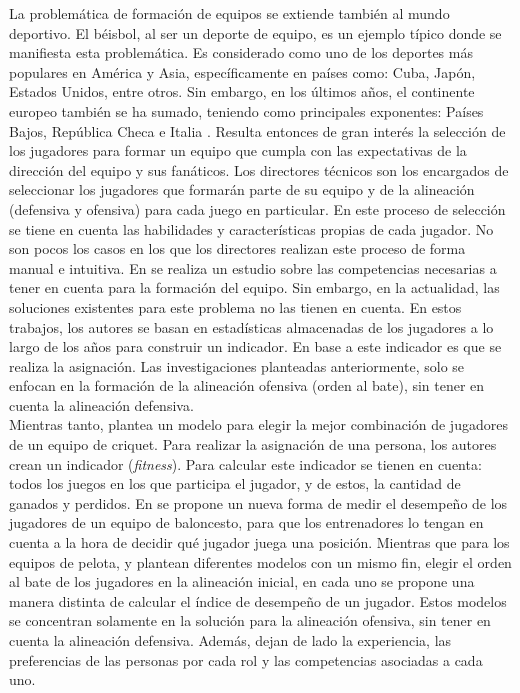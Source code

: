 La problemática de formación de equipos se extiende también al mundo deportivo. El béisbol, al ser un deporte de equipo, es un ejemplo típico donde se manifiesta esta problemática. Es considerado como uno de los deportes más populares en América y Asia, específicamente en países como: Cuba, Japón, Estados Unidos, entre otros. Sin embargo, en los últimos años, el continente europeo también se ha sumado, teniendo como principales exponentes: Países Bajos, República Checa e Italia \cite{WBSC2021}. Resulta entonces de gran interés la selección de los jugadores para formar un equipo que cumpla con las expectativas de la dirección del equipo y sus fanáticos. Los directores técnicos son los encargados de seleccionar los jugadores que formarán parte de su equipo y de la alineación (defensiva y ofensiva) para cada juego en particular. En este proceso de selección se tiene en cuenta las habilidades y características propias de cada jugador. No son pocos los casos en los que los directores realizan este proceso de forma manual e intuitiva. En \cite{Smith1995} se realiza un estudio sobre las competencias necesarias a tener en cuenta para la formación del equipo. Sin embargo, en la actualidad, las soluciones existentes para este problema \citep{Polyashuk2015, Sugrue2007} no las tienen en cuenta. En estos trabajos, los autores se basan en estadísticas almacenadas de los jugadores a lo largo de los años para construir un indicador. En base a este indicador es que se realiza la asignación. Las investigaciones planteadas anteriormente, solo se enfocan en la formación de la alineación ofensiva (orden al bate), sin tener en cuenta la alineación defensiva.\\

Mientras tanto, \cite{Burney2012} plantea un modelo para elegir la mejor combinación de jugadores de un equipo de criquet. Para realizar la asignación de una persona, los autores crean un indicador (\textit{fitness}). Para calcular este indicador se tienen en cuenta: todos los juegos en los que participa el jugador, y de estos, la cantidad de ganados y perdidos. En \cite{Cooper2009} se propone un nueva forma de medir el desempeño de los jugadores de un equipo de baloncesto, para que los entrenadores lo tengan en cuenta a la hora de decidir qué jugador juega una posición. Mientras que para los equipos de pelota, \cite{Polyashuk2015} y \cite{Sugrue2007} plantean diferentes modelos con un mismo fin, elegir el orden al bate de los jugadores en la alineación inicial, en cada uno se propone una manera distinta de calcular el índice de desempeño de un jugador. Estos modelos se concentran solamente en la solución para la alineación ofensiva, sin tener en cuenta la alineación defensiva. Además, dejan de lado la experiencia, las preferencias de las personas por cada rol y las competencias asociadas a cada uno.


